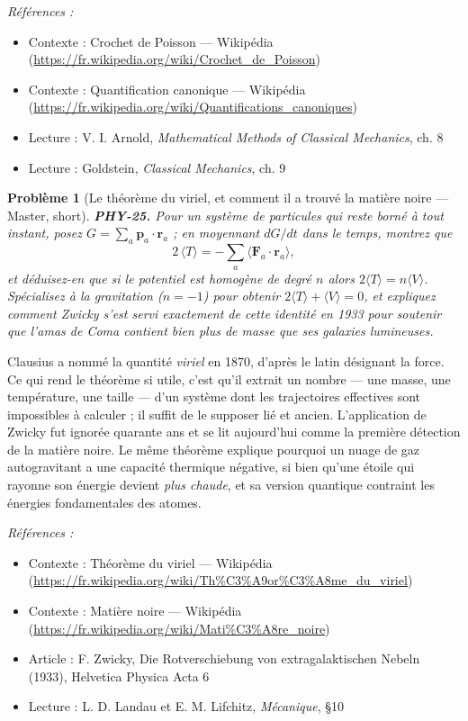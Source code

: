 \documentclass[11pt]{article}
\newtheorem{problem}{Problème}
\newenvironment{refs}{\par\small\noindent\emph{Références :}\begin{itemize}\setlength\itemsep{0pt}}{\end{itemize}\normalsize}
\begin{document}
\begin{refs}
\item Contexte : Crochet de Poisson --- Wikipédia (\url{https://fr.wikipedia.org/wiki/Crochet_de_Poisson})
\item Contexte : Quantification canonique --- Wikipédia (\url{https://fr.wikipedia.org/wiki/Quantifications_canoniques})
\item Lecture : V. I. Arnold, \textit{Mathematical Methods of Classical Mechanics}, ch. 8
\item Lecture : Goldstein, \textit{Classical Mechanics}, ch. 9
\end{refs}

\bigskip

\begin{problem}[{Le théorème du viriel, et comment il a trouvé la matière noire --- Master, short}]
\textbf{PHY-25.} Pour un système de particules qui reste borné à tout
instant, posez $G = \sum_a \mathbf{p}_a \cdot \mathbf{r}_a$ ; en moyennant $dG/dt$ dans le
temps, montrez que
\[ 2\,\langle T \rangle = -\sum_a \bigl\langle \mathbf{F}_a \cdot \mathbf{r}_a
\bigr\rangle, \]
et déduisez-en que si le potentiel est homogène de degré $n$ alors
$2\langle T\rangle = n\langle V\rangle$. Spécialisez à la gravitation ($n = -1$) pour obtenir
$2\langle T\rangle + \langle V\rangle = 0$, et expliquez comment Zwicky s'est servi exactement
de cette identité en 1933 pour soutenir que l'amas de Coma contient bien plus de masse que ses
galaxies lumineuses.
\end{problem}

\noindent Clausius a nommé la quantité \textit{viriel} en 1870, d'après le latin
désignant la force. Ce qui rend le théorème si utile, c'est qu'il extrait un nombre --- une masse,
une température, une taille --- d'un système dont les trajectoires effectives sont impossibles à
calculer ; il suffit de le supposer lié et ancien. L'application de Zwicky fut ignorée quarante
ans et se lit aujourd'hui comme la première détection de la matière noire. Le même théorème
explique pourquoi un nuage de gaz autogravitant a une capacité thermique négative, si bien qu'une
étoile qui rayonne son énergie devient \textit{plus chaude}, et sa version quantique contraint les
énergies fondamentales des atomes.

\begin{refs}
\item Contexte : Théorème du viriel --- Wikipédia (\url{https://fr.wikipedia.org/wiki/Th%C3%A9or%C3%A8me_du_viriel})
\item Contexte : Matière noire --- Wikipédia (\url{https://fr.wikipedia.org/wiki/Mati%C3%A8re_noire})
\item Article : F. Zwicky, \og{} Die Rotverschiebung von extragalaktischen Nebeln \fg{} (1933), Helvetica Physica Acta 6
\item Lecture : L. D. Landau et E. M. Lifchitz, \textit{Mécanique}, \S{}10
\end{refs}
\end{document}

